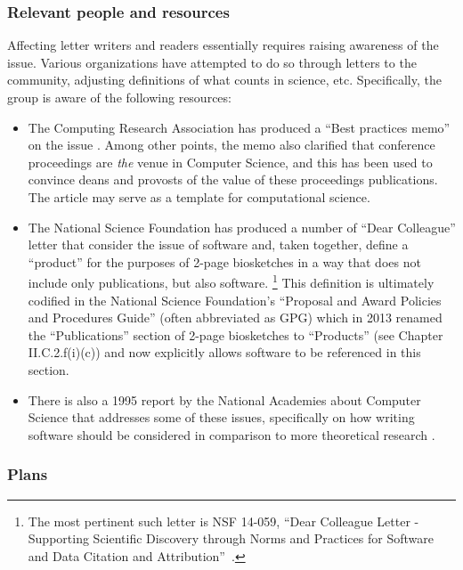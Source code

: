 \subsubsection{Relevant people and resources}

Affecting letter writers and readers essentially requires raising
awareness of the issue. Various organizations have attempted to do so
through letters to the community, adjusting definitions of what counts
in science, etc. Specifically, the group is aware of the following
resources:

\begin{itemize}
\item The Computing Research Association has produced a ``Best
  practices memo'' on the issue \cite{PSU99}. Among other points,
  the memo also clarified that conference proceedings are
  \textit{the} venue in Computer Science, and this has been used to
  convince deans and provosts of the value of these proceedings
  publications. The article may serve as a template for computational
  science.
\item The National Science Foundation has produced a number of ``Dear
  Colleague'' letter that consider the issue of software and, taken
  together, define a ``product'' for the purposes of
  2-page biosketches in a way that does not include only publications, but also
  software.%
  \footnote{The most pertinent such letter is NSF
      14-059, ``Dear Colleague Letter - Supporting Scientific
      Discovery through Norms and Practices for Software and Data
      Citation and Attribution''~\cite{nsf-dcl-citation}.}
  This definition is ultimately codified in the National Science
  Foundation's ``Proposal and Award Policies and Procedures Guide''
  (often abbreviated as GPG) which in 2013 renamed the
  ``Publications'' section of 2-page biosketches to ``Products'' (see
  Chapter II.C.2.f(i)(c)) and now explicitly allows software to be
  referenced in this section.
\item There is also a 1995 report by the National Academies about
  Computer Science that addresses some of these issues, specifically
  on how writing software should be considered in comparison to more
  theoretical research \cite{NRC-careers-94}.
\end{itemize}



\subsubsection{Plans}

